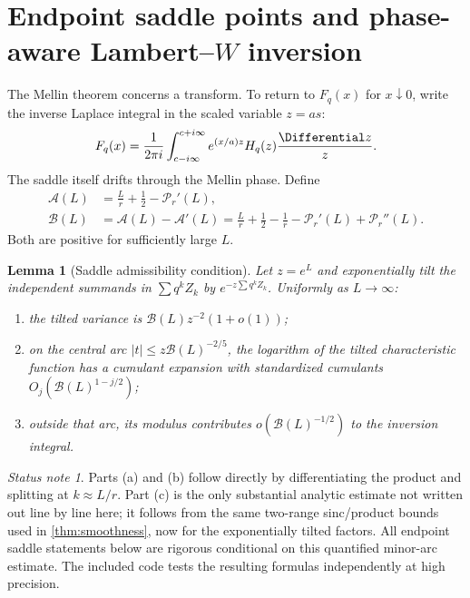 \documentclass[11pt,oneside]{article}
\newtheorem{lemma}[theorem]{Lemma}
\theoremstyle{definition}
\theoremstyle{remark}
\newtheorem{status}[theorem]{Status note}
\newcommand{\cP}{\mathcal P}
\newcommand{\cA}{\mathcal A}
\newcommand{\cB}{\mathcal B}
\begin{document}
\section{Endpoint saddle points and phase-aware Lambert--$W$ inversion}
\label{sec:saddle}

The Mellin theorem concerns a transform.  To return to $F_q(x)$ for $x\downarrow0$,
write the inverse Laplace integral in the scaled variable $z=as$:
\begin{equation}
 F_q(x)=\frac1{2\pi i}\int_{c-i\infty}^{c+i\infty}
 e^{(x/a)z}H_q(z)\frac{\Differential z}{z}.
 \label{eq:F-bromwich}
\end{equation}
The saddle itself drifts through the Mellin phase.  Define
\begin{align}
 \cA(L)&=\frac Lr+\frac12-\cP_r'(L),
 \label{eq:A-def}\\
 \cB(L)&=\cA(L)-\cA'(L)
 =\frac Lr+\frac12-\frac1r-\cP_r'(L)+\cP_r''(L).
 \label{eq:B-def}
\end{align}
Both are positive for sufficiently large $L$.

\begin{lemma}[Saddle admissibility condition]
\label{lem:admissibility}
Let $z=e^L$ and exponentially tilt the independent summands in
$\sum q^kZ_k$ by $e^{-z\sum q^kZ_k}$.  Uniformly as $L\to\infty$:
\begin{enumerate}[label=(\alph*)]
\item the tilted variance is $\cB(L)z^{-2}(1+o(1))$;
\item on the central arc $|t|\le z\cB(L)^{-2/5}$, the logarithm of the tilted
characteristic function has a cumulant expansion with standardized cumulants
$O_j(\cB(L)^{1-j/2})$;
\item outside that arc, its modulus contributes $o(\cB(L)^{-1/2})$ to the inversion
integral.
\end{enumerate}
\end{lemma}

\begin{status}
Parts (a) and (b) follow directly by differentiating the product and splitting at
$k\approx L/r$.  Part (c) is the only substantial analytic estimate not written out
line by line here; it follows from the same two-range sinc/product bounds used in
\cref{thm:smoothness}, now for the exponentially tilted factors.  All endpoint saddle
statements below are rigorous conditional on this quantified minor-arc estimate.  The
included code tests the resulting formulas independently at high precision.
\end{status}
\end{document}
